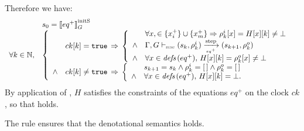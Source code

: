 \begin{skippableproof}
    Therefore we have:
    \begin{equation*}
        \begin{array}{ll}
                              & s_0 = \initstate{eq^+} \\
            \forall k \in \N, &
            \left\{
            \begin{array}{ll}
                       & ck[k] = \true \, \Rightarrow \,
                \left\{
                \begin{array}{ll}
                           & \forall x, \in \{x_i^+\} \cup \{x_m^+\} \Rightarrow \rho^i_k[x] = H[x][k] \neq \bot \\
                    \wedge & \eqOpsem{\rho^i_k}{s_k}{eq^+}{s_{k+1}}{\rho^o_k}                                    \\
                    \wedge & \forall x \in \defs{eq^+}, \, H[x][k] = \rho^o_k[x] \neq \bot                       \\
                \end{array}
                \right.                                     \\
                \wedge & ck[k] \neq \true \, \Rightarrow \,
                \left\{
                \begin{array}{ll}
                           & s_{k+1} = s_k \wedge \rho^i_k = \emptyrho \wedge \rho^o_k = \emptyrho \\
                    \wedge & \forall x \in \defs{eq^+}, \, H[x][k] = \bot.                         \\
                \end{array}
                \right.                                     \\
            \end{array}
            \right.
        \end{array}
    \end{equation*}
    By application of , $H$ satisfies the constraints of the
    equations $eq^+$ on the clock $ck$, so that  holds.

    The rule  ensures that the denotational semantics
     holds.


\end{skippableproof}
